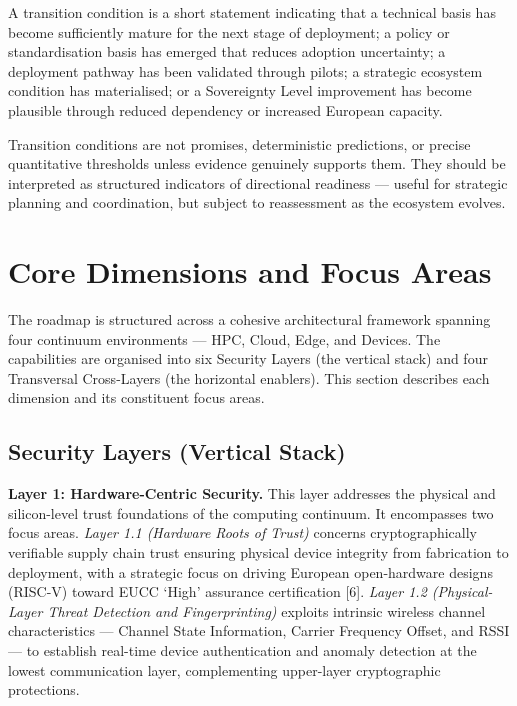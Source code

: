 \documentclass{ieeeaccess}
\begin{document}
A transition condition is a short statement indicating that a technical
basis has become sufficiently mature for the next stage of deployment; a
policy or standardisation basis has emerged that reduces adoption
uncertainty; a deployment pathway has been validated through pilots; a
strategic ecosystem condition has materialised; or a Sovereignty Level
improvement has become plausible through reduced dependency or increased
European capacity.

Transition conditions are not promises, deterministic predictions, or
precise quantitative thresholds unless evidence genuinely supports them.
They should be interpreted as structured indicators of directional
readiness --- useful for strategic planning and coordination, but
subject to reassessment as the ecosystem evolves.

\section{Core Dimensions and Focus
Areas}\label{core-dimensions-and-focus-areas}

The roadmap is structured across a cohesive architectural framework
spanning four continuum environments --- HPC, Cloud, Edge, and Devices.
The capabilities are organised into six Security Layers (the vertical
stack) and four Transversal Cross-Layers (the horizontal enablers). This
section describes each dimension and its constituent focus areas.

\subsection{Security Layers (Vertical
Stack)}\label{security-layers-vertical-stack}

\textbf{Layer 1: Hardware-Centric Security.} This layer addresses the
physical and silicon-level trust foundations of the computing continuum.
It encompasses two focus areas. \emph{Layer 1.1 (Hardware Roots of
Trust)} concerns cryptographically verifiable supply chain trust
ensuring physical device integrity from fabrication to deployment, with
a strategic focus on driving European open-hardware designs (RISC-V)
toward EUCC `High' assurance certification {[}6{]}. \emph{Layer 1.2
(Physical-Layer Threat Detection and Fingerprinting)} exploits intrinsic
wireless channel characteristics --- Channel State Information, Carrier
Frequency Offset, and RSSI --- to establish real-time device
authentication and anomaly detection at the lowest communication layer,
complementing upper-layer cryptographic protections.
\end{document}
